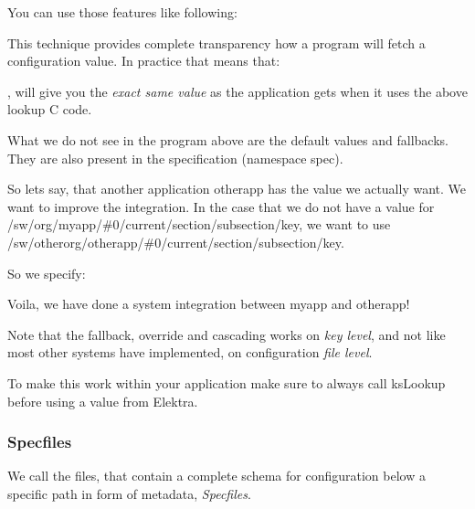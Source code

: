 You can use those features like following\+:




This technique provides complete transparency how a program will fetch a configuration value. In practice that means that\+:




, will give you the {\itshape exact same value} as the application gets when it uses the above lookup C code.

What we do not see in the program above are the default values and fallbacks. They are also present in the specification (namespace {\ttfamily spec}).

So lets say, that another application {\ttfamily otherapp} has the value we actually want. We want to improve the integration. In the case that we do not have a value for {\ttfamily /sw/org/myapp/\#0/current/section/subsection/key}, we want to use {\ttfamily /sw/otherorg/otherapp/\#0/current/section/subsection/key}.

So we specify\+:




Voila, we have done a system integration between {\ttfamily myapp} and {\ttfamily otherapp}!

Note that the fallback, override and cascading works on {\itshape key level}, and not like most other systems have implemented, on configuration {\itshape file level}.

To make this work within your application make sure to always call {\ttfamily ks\+Lookup} before using a value from Elektra.

\subsubsection*{Specfiles}

We call the files, that contain a complete schema for configuration below a specific path in form of metadata, {\itshape Specfiles}.

